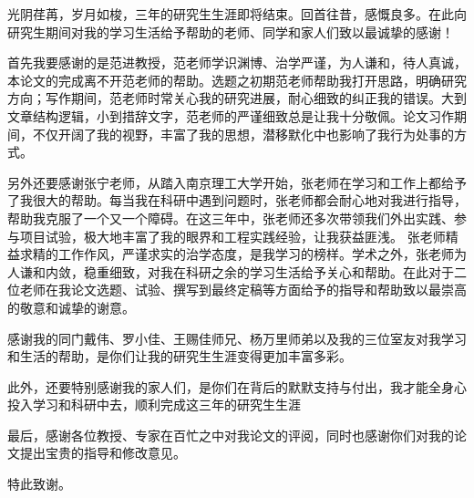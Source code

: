 \begin{thanks}
光阴荏苒，岁月如梭，三年的研究生生涯即将结束。回首往昔，感慨良多。在此向研究生期间对我的学习生活给予帮助的老师、同学和家人们致以最诚挚的感谢！

首先我要感谢的是范进教授，范老师学识渊博、治学严谨，为人谦和，待人真诚，本论文的完成离不开范老师的帮助。选题之初期范老师帮助我打开思路，明确研究方向；写作期间，范老师时常关心我的研究进展，耐心细致的纠正我的错误。大到文章结构逻辑，小到措辞文字，范老师的严谨细致总是让我十分敬佩。论文习作期间，不仅开阔了我的视野，丰富了我的思想，潜移默化中也影响了我行为处事的方式。

另外还要感谢张宁老师，从踏入南京理工大学开始，张老师在学习和工作上都给予了我很大的帮助。每当我在科研中遇到问题时，张老师都会耐心地对我进行指导，帮助我克服了一个又一个障碍。在这三年中，张老师还多次带领我们外出实践、参与项目试验，极大地丰富了我的眼界和工程实践经验，让我获益匪浅。
张老师精益求精的工作作风，严谨求实的治学态度，是我学习的榜样。学术之外，张老师为人谦和内敛，稳重细致，对我在科研之余的学习生活给予关心和帮助。在此对于二位老师在我论文选题、试验、撰写到最终定稿等方面给予的指导和帮助致以最崇高的敬意和诚挚的谢意。

感谢我的同门戴伟、罗小佳、王赐佳师兄、杨万里师弟以及我的三位室友对我学习和生活的帮助，是你们让我的研究生生涯变得更加丰富多彩。

此外，还要特别感谢我的家人们，是你们在背后的默默支持与付出，我才能全身心投入学习和科研中去，顺利完成这三年的研究生生涯

最后，感谢各位教授、专家在百忙之中对我论文的评阅，同时也感谢你们对我的论文提出宝贵的指导和修改意见。


特此致谢。
   

    \vskip 18pt

\end{thanks}